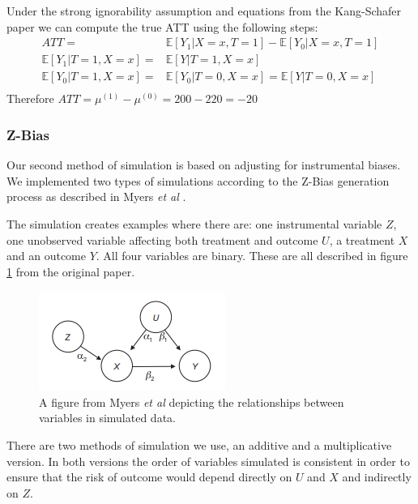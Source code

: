 \documentclass{article}
\begin{document}
Under the strong ignorability assumption and equations from the Kang-Schafer paper we can compute the true ATT using the following steps:
\begin{equation*}
    \begin{split}
        ATT = & \mathbb{E}[Y_1 | X=x, T=1] - \mathbb{E}[Y_0 | X=x, T=1] \\
        \mathbb{E}[Y_1|T=1, X=x] = & \mathbb{E}[Y|T=1, X=x] \\
        \mathbb{E}[Y_0|T=1, X=x] = & \mathbb{E}[Y_0|T=0, X=x] = \mathbb{E}[Y|T=0, X=x] \\
    \end{split}
\end{equation*}
Therefore $ATT=\mu{}^{(1)} - \mu{}^{(0)} = 200-220 = -20$ 

\subsubsection{Z-Bias}
Our second method of simulation is based on adjusting for instrumental biases. We implemented two types of simulations according to the Z-Bias generation process as described in Myers \textit{et al} \cite{myers2011effects}.

The simulation creates examples where there are: one instrumental variable $Z$, one unobserved variable affecting both treatment and outcome $U$, a treatment $X$ and an outcome $Y$. All four variables are binary. These are all described in figure \ref{fig:z_bias_explanation} from the original paper.

\begin{figure}
    \centering
    \includegraphics{Paper/images/z_bias_schema.png}
    \caption{A figure from Myers \textit{et al} depicting the relationships between variables in simulated data.}
    \label{fig:z_bias_explanation}
\end{figure} 

There are two methods of simulation we use, an additive and a multiplicative version. In both versions the order of variables simulated is consistent in order to ensure that the risk of outcome would depend directly on $U$ and $X$ and indirectly on $Z$.
\end{document}
